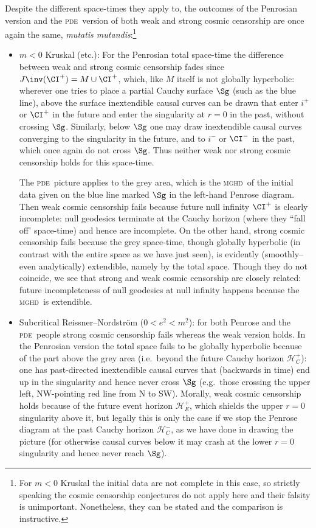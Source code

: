 \documentclass[11pt,a4paper]{article}
\newcommand{\mghd}{\textsc{mghd}}
\newcommand{\pde}{\textsc{pde}}
\begin{document}
\noindent  Despite the different space-times they apply to, the outcomes of the Penrosian version and the \pde\ version of both weak and strong cosmic censorship are once again the same, \emph{mutatis mutandis}:\footnote{For $m<0$ Kruskal the initial data are not complete in this case, so strictly speaking the cosmic censorship conjectures do not apply here and their falsity is unimportant. Nonetheless, they can be stated and the comparison is instructive.} 
\begin{itemize}
\item  $m<0$ Kruskal (etc.): For the Penrosian total space-time the difference between weak and strong  cosmic censorship  fades since
 $J\inv(\CI^+)=M\cup\CI^+$, which, like $M$ itself is not globally hyperbolic: wherever one tries to place a partial Cauchy surface $\Sg$ (such as the blue line), above the surface  inextendible causal curves can be drawn that enter $i^+$ or $\CI^+$ in the future and enter the singularity at $r=0$ in the past, without  crossing $\Sg$. Similarly, below $\Sg$ one may draw  inextendible causal curves converging to the
 singularity in the future, and to  $i^-$ or $\CI^-$ in the past, which once again do not cross $\Sg$. Thus neither weak nor strong cosmic censorship  holds for this space-time.
 
The \pde\ picture applies to the grey area, which is the \mghd\ of the initial data given on the blue line marked $\Sg$  in the left-hand Penrose diagram. Then
 weak cosmic censorship fails because future null infinity $\CI^+$ is clearly incomplete: null geodesics terminate at the Cauchy horizon (where they ``fall off' space-time) and hence are incomplete. On the other hand, strong cosmic censorship fails because the grey space-time, though globally hyperbolic (in contrast with the entire space as we have just seen), is evidently (smoothly--even analytically) extendible, namely by the total space.  Though they do not coincide, we see  that strong and weak cosmic censorship are closely related: future incompleteness of null geodesics at null infinity 
happens because the \mghd\ is extendible.
 
 \item  Subcritical Reissner--Nordstr\"{o}m  ($0<e^2<m^2$):  for both Penrose and the \pde\ people strong cosmic censorship fails whereas the weak version holds.
  In the Penrosian version the total space  fails to be globally hyperbolic because of the part above the grey area (i.e.\ beyond the future Cauchy horizon $\mathcal{H}_C^+$): one has past-directed inextendible causal curves that (backwards in time) end up in the singularity and hence never cross $\Sg$ (e.g.\ those crossing the upper left, NW-pointing red line from N to SW). 
  Morally, weak  cosmic censorship  holds because of the future event horizon $\mathcal{H}_E^+$, which shields the upper $r=0$ singularity above it, 
  but legally this is only the case if we stop the Penrose diagram at the past Cauchy horizon $\mathcal{H}_C^-$, as we have  done in drawing the picture (for otherwise causal curves below it may crash at the  lower $r=0$ singularity and hence never reach $\Sg$). 
  

\end{itemize}
\end{document}
